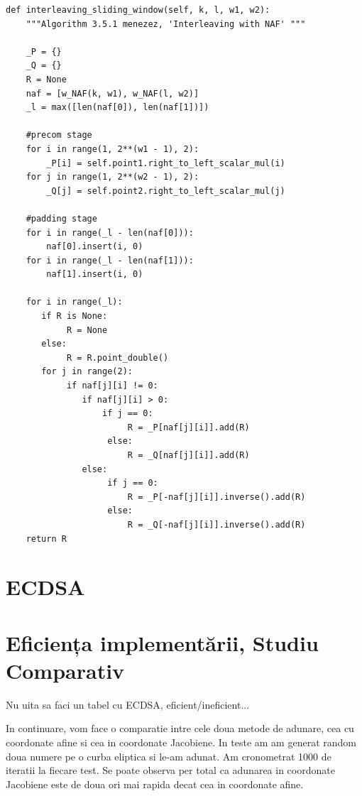 \begin{lstlisting}
def interleaving_sliding_window(self, k, l, w1, w2):
    """Algorithm 3.5.1 menezez, 'Interleaving with NAF' """

    _P = {}
    _Q = {}
    R = None
    naf = [w_NAF(k, w1), w_NAF(l, w2)]
    _l = max([len(naf[0]), len(naf[1])])

    #precom stage
    for i in range(1, 2**(w1 - 1), 2):
        _P[i] = self.point1.right_to_left_scalar_mul(i)
    for j in range(1, 2**(w2 - 1), 2):
        _Q[j] = self.point2.right_to_left_scalar_mul(j)
 
    #padding stage
    for i in range(_l - len(naf[0])):
        naf[0].insert(i, 0)
    for i in range(_l - len(naf[1])):
        naf[1].insert(i, 0)

    for i in range(_l):
       if R is None:
            R = None
       else:
            R = R.point_double()
       for j in range(2):
            if naf[j][i] != 0:
               if naf[j][i] > 0:
                   if j == 0:
                        R = _P[naf[j][i]].add(R)
                    else:
                        R = _Q[naf[j][i]].add(R)
               else:
                    if j == 0:
                        R = _P[-naf[j][i]].inverse().add(R)
                    else:
                        R = _Q[-naf[j][i]].inverse().add(R)
    return R

\end{lstlisting}

\section{ECDSA}

\section{Eficiența implementării, Studiu Comparativ}

Nu uita sa faci un tabel cu ECDSA, eficient/ineficient... 


In continuare, vom face o comparatie intre cele doua metode de adunare, cea cu coordonate afine si cea in coordonate Jacobiene. In teste am am generat random doua numere pe o curba eliptica si le-am adunat. Am cronometrat 1000 de iteratii la fiecare test. Se poate observa per total ca adunarea in coordonate Jacobiene este de doua ori mai rapida decat cea in coordonate afine.

